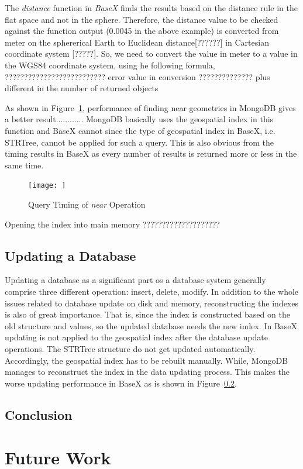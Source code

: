 \documentclass[a4paper,12pt]{article}
\begin{document}
The \textit{distance} function in \textit{BaseX} finds the results based on the distance rule in the flat space and not in the sphere. Therefore, the distance value to be checked against the function output (0.0045 in the above example) is converted from meter on the sphererical Earth to Euclidean distance[??????] in Cartesian coordinate system [?????].
So, we need to convert the value in meter to a value in the WGS84 coordinate system, using he following formula,
??????????????????????????
error value in conversion ?????????????? plus different in the number of returned objects

As shown in Figure~\ref{figBXvsMongoNear}, performance of finding near geometries in MongoDB gives a better result............
MongoDB basically uses the geospatial index in this function and BaseX cannot since the type of geospatial index in BaseX, i.e. STRTree, cannot be applied for such a query. This is also obvious from the timing results in BaseX as every number of results is returned more or less in the same time.


\begin{figure}
\centering
\texttt{[image: ]}
\caption{Query Timing of \textit{near} Operation}
\label{figBXvsMongoNear}
\end{figure}


Opening the index into main memory ????????????????????


\subsection{Updating a Database}

Updating a database as a significant part os a database system generally comprise three different operation: insert, delete, modify. In addition to the whole issues related to database update on disk and memory, reconstructing the indexes is also of great importance. That is, since the index is constructed based on the old structure and values, so the updated database needs the new index. In BaseX updating is not applied to the geospatial index after the database update operations. The STRTree structure do not get updated automatically. Accordingly, the geospatial index has to be rebuilt manually. While, MongoDB manages to reconstruct the index in the data updating process. This makes the worse updating performance in BaseX as is shown in Figure~\ref{}.
\subsection{Conclusion}


\newpage
\section{Future Work}
\label{s.future}
\newpage


\end{document}

